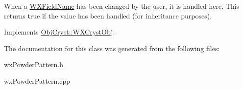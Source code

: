 When a \mbox{\hyperlink{class_obj_cryst_1_1_w_x_field_name}{W\+X\+Field\+Name}} has been changed by the user, it is handled here. This returns true if the value has been handled (for inheritance purposes). 

Implements \mbox{\hyperlink{class_obj_cryst_1_1_w_x_cryst_obj_a3736357599263df7e550790753c040a3}{Obj\+Cryst\+::\+W\+X\+Cryst\+Obj}}.



The documentation for this class was generated from the following files\+:\begin{DoxyCompactItemize}
\item 
wx\+Powder\+Pattern.\+h\item 
wx\+Powder\+Pattern.\+cpp\end{DoxyCompactItemize}
